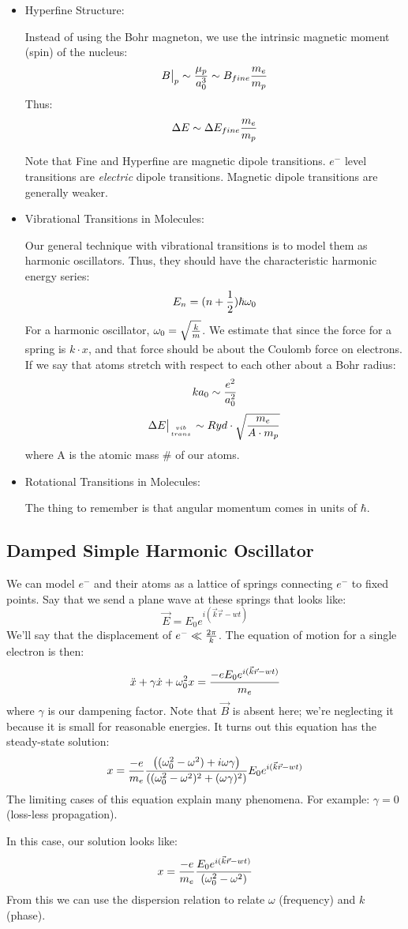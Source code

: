 \documentclass[11pt]{article}
\def\.{\dot}
\def\hf{{1 \over 2}}
\def\eval#1{\big|_{#1}}
\def\wz{\omega_0}
\def\ef{\vec E}
\def\bfield{{\vec B}}
\begin{document}
\begin{itemize}
\item Hyperfine Structure:\par
Instead of using the Bohr magneton, we use the intrinsic magnetic moment
(spin) of the nucleus:
$$B\eval{p}\sim{\mu_p\over a_0^3}\sim B_{fine}{m_e\over m_p}$$
Thus:
$$\Delta E\sim\Delta E_{fine}{m_e\over m_p}$$

Note that Fine and Hyperfine are magnetic dipole transitions.  $e^-$ level
transitions are {\it electric} dipole transitions.  Magnetic dipole transitions
are generally weaker.

\item  Vibrational Transitions in Molecules:\par
Our general technique with vibrational transitions is to model them as
harmonic oscillators.  Thus, they should have the characteristic harmonic
energy series:
$$E_n=(n+\hf)\hbar\wz$$
For a harmonic oscillator, $\wz=\sqrt{k\over m}$.  We estimate that since
the force for a spring is $k\cdot x$, and that force should be about the 
Coulomb force on electrons.  If we say that atoms stretch with respect to
each other about a Bohr radius:
$$ka_0\sim{e^2\over a_0^2}$$
$$\Delta E\eval{vib\atop trans}\sim Ryd\cdot\sqrt{m_e\over A\cdot m_p}$$
where A is the atomic mass \# of our atoms.

\item  Rotational Transitions in Molecules:\par
The thing to remember is that angular momentum comes in units of $\hbar$.
\end{itemize}

\subsection*{ Damped Simple Harmonic Oscillator}

We can model $e^-$ and their atoms as a lattice of springs connecting $e^-$
to fixed points.  Say that we send a plane wave at these springs that
looks like:
\def\eikrwt{e^{i(\vec k\vec r-wt)}}
$$\ef=E_0\eikrwt$$
We'll say that the displacement of $e^-\ll{2\pi\over k}$.  The equation of
motion for a single electron is then:
$$\ddot x+\gamma\.x+\wz^2x={-eE_0\eikrwt\over m_e}$$
where $\gamma$ is our dampening factor.  Note that $\bfield$ is absent 
here; we're neglecting it because it is small for
reasonable energies. It turns out this
equation has the steady-state solution:
$$x={-e\over m_e}{\left((\wz^2-\omega^2)+i\omega\gamma\right)\over
\left((\wz^2-\omega^2)^2+(\omega\gamma)^2\right)}E_0\eikrwt$$
The limiting cases of this equation explain many phenomena.  For example:
$\gamma=0$ (loss-less propagation).\par
In this case, our solution looks like:
$$x={-e\over m_e}{E_0\eikrwt\over(\wz^2-\omega^2)}$$
From this we can use the dispersion relation to relate $\omega$ (frequency) and
$k$ (phase).
\end{document}
